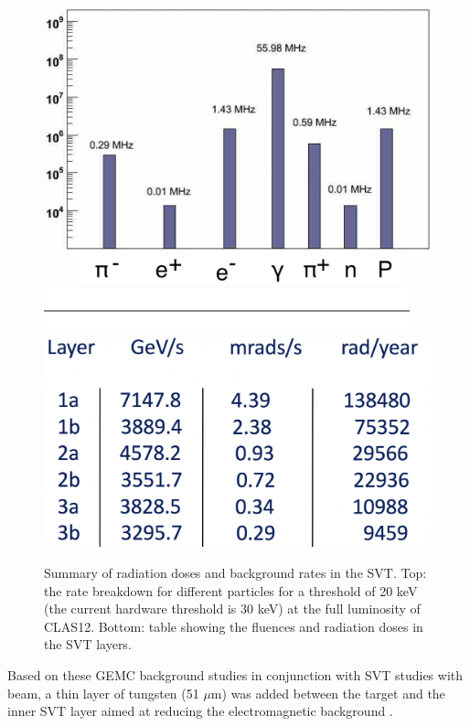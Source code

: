 \begin{figure}
	\centering
	\includegraphics[width=0.99\columnwidth,keepaspectratio]{img/bstRates.png}
	\includegraphics[width=0.99\columnwidth,keepaspectratio]{img/blank.png}
	\includegraphics[width=0.99\columnwidth,keepaspectratio]{img/bstRadSummary.png}
	\caption{Summary of radiation doses and background rates in the SVT. Top: the rate breakdown for different particles
             for a threshold of 20 keV (the current hardware threshold is 30 keV) at the full luminosity of CLAS12.
             Bottom: table showing the fluences and radiation doses in the SVT layers. }
	\label{fig:radStudy}
\end{figure}

Based on these GEMC background studies in conjunction with SVT studies with beam, a thin layer of tungsten
(51 $\mu$m) was added between the target and the inner SVT layer aimed at reducing the electromagnetic
background \cite{bstDose}.






